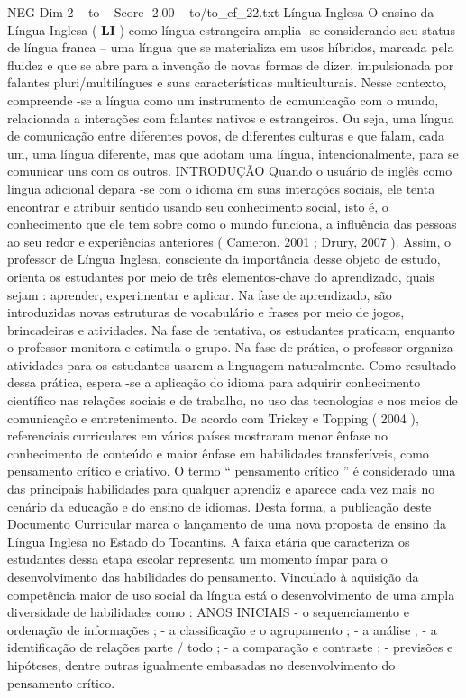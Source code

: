 \begin{textsample}{NEG Dim 2 – to – Score -2.00 – to/to\_ef\_22.txt}  \label{ex:f2_neg_160}
Língua Inglesa O ensino da Língua Inglesa ( \textbf{LI} ) como língua estrangeira amplia -se considerando seu status de língua franca – uma língua que se materializa em usos híbridos, marcada pela fluidez e que se abre para a invenção de novas formas de dizer, impulsionada por falantes pluri/multilíngues e suas características multiculturais.
Nesse contexto, compreende -se a língua como um instrumento de comunicação com o mundo, relacionada a interações com falantes nativos e estrangeiros.
Ou seja, uma língua de comunicação entre diferentes povos, de diferentes culturas e que falam, cada um, uma língua diferente, mas que adotam uma língua, intencionalmente, para se comunicar uns com os outros.
INTRODUÇÃO Quando o usuário de inglês como língua adicional depara -se com o idioma em suas interações sociais, ele tenta encontrar e atribuir sentido usando seu conhecimento social, isto é, o conhecimento que ele tem sobre como o mundo funciona, a influência das pessoas ao seu redor e experiências anteriores ( Cameron, 2001 ; Drury, 2007 ).
Assim, o professor de Língua Inglesa, consciente da importância desse objeto de estudo, orienta os estudantes por meio de três elementos-chave do aprendizado, quais sejam : aprender, experimentar e aplicar.
Na fase de aprendizado, são introduzidas novas estruturas de vocabulário e frases por meio de jogos, brincadeiras e atividades.
Na fase de tentativa, os estudantes praticam, enquanto o professor monitora e estimula o grupo.
Na fase de prática, o professor organiza atividades para os estudantes usarem a linguagem naturalmente.
Como resultado dessa prática, espera -se a aplicação do idioma para adquirir conhecimento científico nas relações sociais e de trabalho, no uso das tecnologias e nos meios de comunicação e entretenimento.
De acordo com Trickey e Topping ( 2004 ), referenciais curriculares em vários países mostraram menor ênfase no conhecimento de conteúdo e maior ênfase em habilidades transferíveis, como pensamento crítico e criativo.
O termo “ pensamento crítico ” é considerado uma das principais habilidades para qualquer aprendiz e aparece cada vez mais no cenário da educação e do ensino de idiomas.
Desta forma, a publicação deste Documento Curricular marca o lançamento de uma nova proposta de ensino da Língua Inglesa no Estado do Tocantins.
A faixa etária que caracteriza os estudantes dessa etapa escolar representa um momento ímpar para o desenvolvimento das habilidades do pensamento.
Vinculado à aquisição da competência maior de uso social da língua está o desenvolvimento de uma ampla diversidade de habilidades como : ANOS INICIAIS - o sequenciamento e ordenação de informações ; - a classificação e o agrupamento ; - a análise ; - a identificação de relações parte / todo ; - a comparação e contraste ; - previsões e hipóteses, dentre outras igualmente embasadas no desenvolvimento do pensamento crítico.

\end{textsample}
